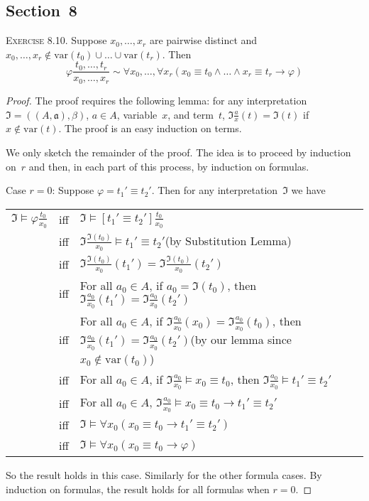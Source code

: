 \documentclass[letterpaper]{article}
\newcommand{\lequ}{\equiv}
\newcommand{\limp}{\rightarrow}
\newcommand{\lequiv}{\sim}
\newcommand{\var}{\mathrm{var}}
\theoremstyle{remark}
\begin{document}
\subsection*{Section~8}
\noindent\textsc{Exercise 8.10.}
Suppose $x_0,\ldots,x_r$ are pairwise distinct and $x_0,\ldots,x_r\not\in\var(t_0)\cup\ldots\cup\var(t_r)$. Then
$$\varphi\frac{t_0,\ldots,t_r}{x_0,\ldots,x_r}\lequiv\forall x_0,\ldots,\forall x_r(x_0\lequ t_0\land\ldots\land x_r\lequ t_r\limp\varphi)$$
\begin{proof}
The proof requires the following lemma: for any interpretation $\mathfrak{I}=((A,\mathfrak{a}), \beta)$, $a\in A$, variable~$x$, and term~$t$, $\mathfrak{I}\tfrac{a}{x}(t)=\mathfrak{I}(t)$ if $x\not\in\var(t)$. The proof is an easy induction on terms.

We only sketch the remainder of the proof. The idea is to proceed by induction on~$r$ and then, in each part of this process, by induction on formulas.

Case $r=0$: Suppose $\varphi=t_1'\lequ t_2'$. Then for any interpretation~$\mathfrak{I}$ we have
\begin{center}
\begin{tabular}{rcp{}}
$\mathfrak{I}\models\varphi\tfrac{t_0}{x_0}$&iff&$\mathfrak{I}\models[t_1'\lequ t_2']\tfrac{t_0}{x_0}$\\
    &iff&$\mathfrak{I}\tfrac{\mathfrak{I}(t_0)}{x_0}\models t_1'\lequ t_2'$\newline(by Substitution Lemma)\\
    &iff&$\mathfrak{I}\tfrac{\mathfrak{I}(t_0)}{x_0}(t_1')=\mathfrak{I}\tfrac{\mathfrak{I}(t_0)}{x_0}(t_2')$\\
    &iff&For all $a_0\in A$, if $a_0=\mathfrak{I}(t_0)$, then $\mathfrak{I}\tfrac{a_0}{x_0}(t_1')=\mathfrak{I}\tfrac{a_0}{x_0}(t_2')$\\
    &iff&For all $a_0\in A$, if $\mathfrak{I}\tfrac{a_0}{x_0}(x_0)=\mathfrak{I}\tfrac{a_0}{x_0}(t_0)$, then $\mathfrak{I}\tfrac{a_0}{x_0}(t_1')=\mathfrak{I}\tfrac{a_0}{x_0}(t_2')$\newline(by our lemma since $x_0\not\in\var(t_0)$)\\
    &iff&For all $a_0\in A$, if $\mathfrak{I}\tfrac{a_0}{x_0}\models x_0\lequ t_0$, then $\mathfrak{I}\tfrac{a_0}{x_0}\models t_1'\lequ t_2'$\\
    &iff&For all $a_0\in A$, $\mathfrak{I}\tfrac{a_0}{x_0}\models x_0\lequ t_0\limp t_1'\lequ t_2'$\\
    &iff&$\mathfrak{I}\models\forall x_0(x_0\lequ t_0\limp t_1'\lequ t_2')$\\
    &iff&$\mathfrak{I}\models\forall x_0(x_0\lequ t_0\limp\varphi)$
\end{tabular}
\end{center}
So the result holds in this case. Similarly for the other formula cases. By induction on formulas, the result holds for all formulas when $r=0$.


\end{proof}
\end{document}
